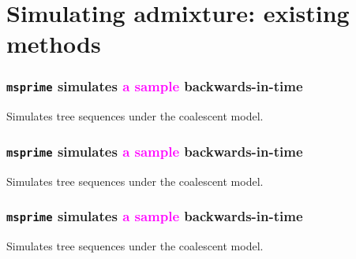 \documentclass[11pt, mathserif, aspectratio=169]{beamer}
\newcommand{\magenta}[1]{\textcolor{magenta}{#1}}
\newcommand{\gray}[1]{\textcolor{gray}{#1}}
\newenvironment{wideitemize}{\itemize\addtolength{\itemsep}{10pt}}{\enditemize}
\begin{document}
\section{Simulating admixture: existing methods}

\begin{frame}
\frametitle{\texttt{msprime} simulates \magenta{a sample} backwards-in-time}
\begin{minipage}{.48\textwidth}

\end{minipage}\hfill
\begin{minipage}{.48\textwidth}
Simulates tree sequences under the coalescent model.\\[5mm]
\end{minipage}
\end{frame}

\begin{frame}
\frametitle{\texttt{msprime} simulates \magenta{a sample} backwards-in-time}
\begin{minipage}{.48\textwidth}

\end{minipage}\hfill
\begin{minipage}{.48\textwidth}
Simulates tree sequences under the coalescent model.\\[5mm]
\end{minipage}
\end{frame}

\begin{frame}
\frametitle{\texttt{msprime} simulates \magenta{a sample} backwards-in-time}
\begin{minipage}{.48\textwidth}

\end{minipage}\hfill
\begin{minipage}{.48\textwidth}
Simulates tree sequences under the coalescent model.\\[5mm]
\end{minipage}
\end{frame}
\end{document}
